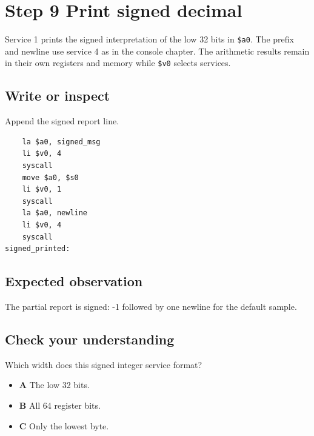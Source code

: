 \section{Step 9 Print signed
  decimal}\label{004-bit-inspector-s09-step-9-print-signed-decimal}

Service 1 prints the signed interpretation of the low 32 bits in
\texttt{\$a0}. The prefix and newline use service 4 as in the console
chapter. The arithmetic results remain in their own registers and memory
while \texttt{\$v0} selects services.

\subsection{Write or
  inspect}\label{004-bit-inspector-s09-write-or-inspect}

Append the signed report line.

\begin{verbatim}
    la $a0, signed_msg
    li $v0, 4
    syscall
    move $a0, $s0
    li $v0, 1
    syscall
    la $a0, newline
    li $v0, 4
    syscall
signed_printed:
\end{verbatim}

\subsection{Expected
  observation}\label{004-bit-inspector-s09-expected-observation}

The partial report is signed: -1 followed by one newline for the default
sample.

\subsection{Check your
  understanding}\label{004-bit-inspector-s09-check-your-understanding}

Which width does this signed integer service format?

\begin{itemize}
  \tightlist
  \item
        \textbf{A} The low 32 bits.
  \item
        \textbf{B} All 64 register bits.
  \item
        \textbf{C} Only the lowest byte.
\end{itemize}
